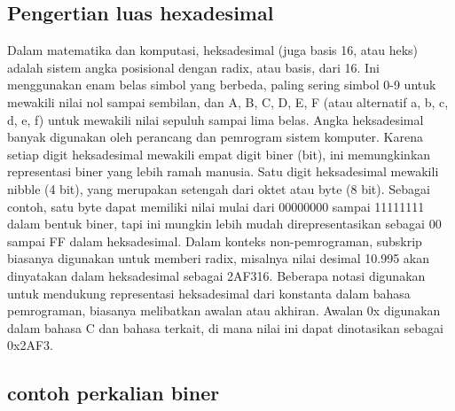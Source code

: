 \subsection{Pengertian luas hexadesimal}
Dalam matematika dan komputasi, heksadesimal (juga basis 16, atau heks) adalah sistem angka posisional dengan radix, atau basis, dari 16. Ini 
menggunakan enam belas simbol yang berbeda, paling sering simbol 0-9 untuk mewakili nilai nol sampai sembilan, dan A, B, C, D, E, F (atau 
alternatif a, b, c, d, e, f) untuk mewakili nilai sepuluh sampai lima belas. Angka heksadesimal banyak digunakan oleh perancang dan pemrogram 
sistem komputer. Karena setiap digit heksadesimal mewakili empat digit biner (bit), ini memungkinkan representasi biner yang lebih ramah manusia. 
Satu digit heksadesimal mewakili nibble (4 bit), yang merupakan setengah dari oktet atau byte (8 bit). Sebagai contoh, satu byte dapat memiliki 
nilai mulai dari 00000000 sampai 11111111 dalam bentuk biner, tapi ini mungkin lebih mudah direpresentasikan sebagai 00 sampai FF dalam heksadesimal.
Dalam konteks non-pemrograman, subskrip biasanya digunakan untuk memberi radix, misalnya nilai desimal 10.995 akan dinyatakan dalam heksadesimal 
sebagai 2AF316. Beberapa notasi digunakan untuk mendukung representasi heksadesimal dari konstanta dalam bahasa pemrograman, biasanya melibatkan 
awalan atau akhiran. Awalan 0x digunakan dalam bahasa C dan bahasa terkait, di mana nilai ini dapat dinotasikan sebagai 0x2AF3.

\subsection {contoh perkalian biner}

